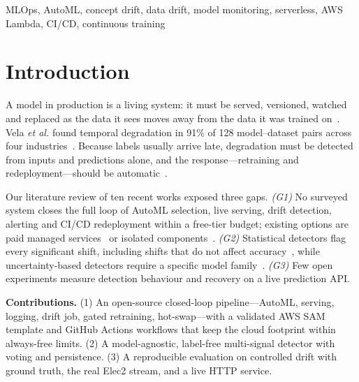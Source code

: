 \documentclass[conference]{IEEEtran}
\begin{document}
\begin{IEEEkeywords}
MLOps, AutoML, concept drift, data drift, model monitoring, serverless, AWS Lambda, CI/CD, continuous training
\end{IEEEkeywords}

\section{Introduction}
A model in production is a living system: it must be served, versioned, watched and replaced as the data it sees moves away from the data it was trained on~\cite{sculley2015}. Vela \emph{et al.} found temporal degradation in 91\% of 128 model--dataset pairs across four industries~\cite{vela2022}. Because labels usually arrive late, degradation must be detected from inputs and predictions alone, and the response---retraining and redeployment---should be automatic~\cite{kreuzberger2023}.

Our literature review of ten recent works exposed three gaps. \emph{(G1)} No surveyed system closes the full loop of AutoML selection, live serving, drift detection, alerting and CI/CD redeployment within a free-tier budget; existing options are paid managed services~\cite{nigenda2022} or isolated components~\cite{garg2021,zoller2021,baier2021}. \emph{(G2)} Statistical detectors flag every significant shift, including shifts that do not affect accuracy~\cite{eck2022}, while uncertainty-based detectors require a specific model family~\cite{baier2021}. \emph{(G3)} Few open experiments measure detection behaviour and recovery on a live prediction API.

\textbf{Contributions.} (1) An open-source closed-loop pipeline---AutoML, serving, logging, drift job, gated retraining, hot-swap---with a validated AWS SAM template and GitHub Actions workflows that keep the cloud footprint within always-free limits. (2) A model-agnostic, label-free multi-signal detector with voting and persistence. (3) A reproducible evaluation on controlled drift with ground truth, the real Elec2 stream, and a live HTTP service.
\end{document}
